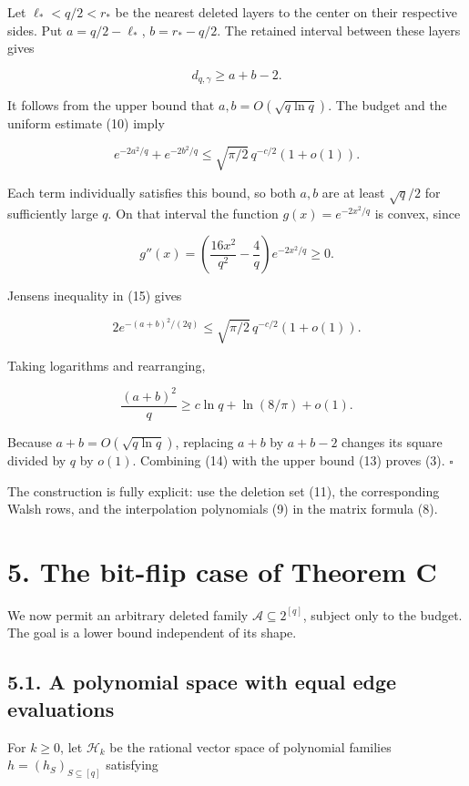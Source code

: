 \documentclass[
  10pt,
]{article}
\begin{document}
Let \(\ell_*<q/2<r_*\) be the nearest deleted layers to the center on their respective sides. Put \(a=q/2-\ell_*\), \(b=r_*-q/2\). The retained interval between these layers gives

\[
 d_{q,\gamma}\ge a+b-2.\tag{14}
\]

It follows from the upper bound that \(a,b=O(\sqrt{q\ln q})\). The budget and the uniform estimate (10) imply

\[
 e^{-2a^2/q}+e^{-2b^2/q}
 \le \sqrt{\pi/2}\,q^{-c/2}(1+o(1)).\tag{15}
\]

Each term individually satisfies this bound, so both \(a,b\) are at least \(\sqrt q/2\) for sufficiently large \(q\). On that interval the function \(g(x)=e^{-2x^2/q}\) is convex, since

\[
 g''(x)=\left(\frac{16x^2}{q^2}-\frac4q\right)e^{-2x^2/q}\ge0.
\]

Jensen\textquotesingle s inequality in (15) gives

\[
 2e^{-(a+b)^2/(2q)}\le \sqrt{\pi/2}\,q^{-c/2}(1+o(1)).
\]

Taking logarithms and rearranging,

\[
 \frac{(a+b)^2}{q}\ge c\ln q+\ln(8/\pi)+o(1).
\]

Because \(a+b=O(\sqrt{q\ln q})\), replacing \(a+b\) by \(a+b-2\) changes its square divided by \(q\) by \(o(1)\). Combining (14) with the upper bound (13) proves (3). \(\square\)

The construction is fully explicit: use the deletion set (11), the corresponding Walsh rows, and the interpolation polynomials (9) in the matrix formula (8).

\section{5. The bit-flip case of Theorem C}\label{proof-of-theorem-c}

We now permit an arbitrary deleted family \(\mathcal A\subseteq2^{[q]}\), subject only to the budget. The goal is a lower bound independent of its shape.

\subsection{5.1. A polynomial space with equal edge evaluations}\label{a-polynomial-space-with-equal-edge-evaluations}

For \(k\ge0\), let \(\mathcal H_k\) be the rational vector space of polynomial families \(h=(h_S)_{S\subseteq[q]}\) satisfying
\end{document}
